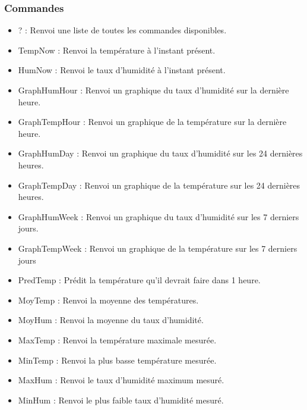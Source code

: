 \documentclass[10pt]{article}
\begin{document}
\subsubsection{Commandes}
\begin{itemize}
\item ? : Renvoi une liste de toutes les commandes disponibles.
\item TempNow : Renvoi la température à l'instant présent.
\item HumNow : Renvoi le taux d'humidité à l'instant présent.
\item GraphHumHour : Renvoi un graphique du taux d'humidité sur la dernière heure.
\item GraphTempHour : Renvoi un graphique de la température sur la dernière heure.
\item GraphHumDay : Renvoi un graphique du taux d'humidité sur les 24 dernières heures.
\item GraphTempDay : Renvoi un graphique de la température sur les 24 dernières heures.
\item GraphHumWeek : Renvoi un graphique du taux d'humidité sur les 7 derniers jours.
\item GraphTempWeek : Renvoi un graphique de la température sur les 7 derniers jours
\item PredTemp : Prédit la température qu'il devrait faire dans 1 heure.
\item MoyTemp : Renvoi la moyenne des températures.
\item MoyHum : Renvoi la moyenne du taux d'humidité.
\item MaxTemp : Renvoi la température maximale mesurée.
\item MinTemp : Renvoi la plus basse température mesurée.
\item MaxHum : Renvoi le taux d'humidité maximum mesuré.
\item MinHum : Renvoi le plus faible taux d'humidité mesuré.
\end{itemize}
\end{document}
